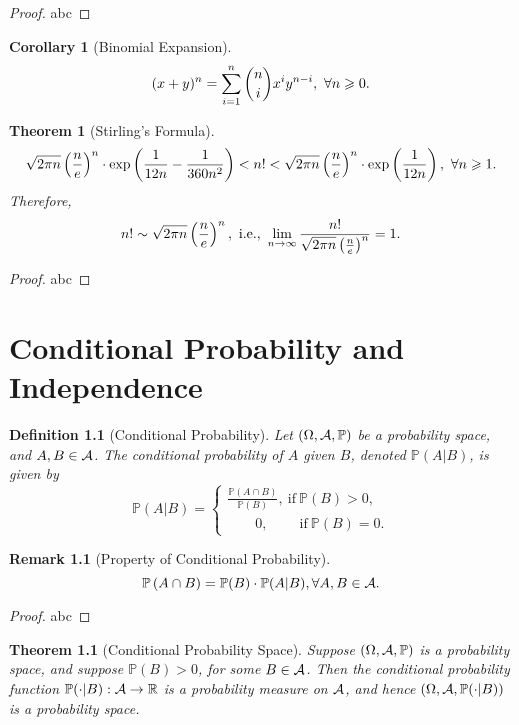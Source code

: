 \documentclass[openany,12pt]{book}
\newtheorem{theorem}{Theorem}[chapter]
\newtheorem{corollary}{Corollary}[chapter]
\newtheorem{remark}{Remark}[chapter]
\newtheorem{definition}{Definition}[chapter]
\begin{document}
\begin{proof}
  abc
\end{proof}

\begin{corollary}[Binomial Expansion]
$$(x+y)^n=\sum_{i=1}^{n}\binom n i  x^i y^{n-i},~\forall n\geqslant 0.$$
\end{corollary}

\begin{theorem}[Stirling's Formula]
$$\sqrt{2\pi n} 
\left(\frac{n}{e}\right)^n
\cdot
\exp\left(\frac{1}{12n}-\frac{1}{360 n^2 }\right) 
<n!
<\sqrt{2\pi n} 
\left(\frac{n}{e}\right)^n
\cdot\exp\left(\frac{1}{12n}\right),\ 
\forall n\gs1.$$
Therefore, 
$$n!\sim\sqrt{2\pi n} \left(\frac{n}{e}\right)^n,\ \text{i.e.},\ \limn \frac{n!}{\sqrt{2\pi n} \left(\frac{n}{e}\right)^n}=1.$$
\end{theorem}

\begin{proof}
  abc
\end{proof}

\chapter{Conditional Probability and Independence}

\begin{definition}[Conditional Probability]
Let $(\Omega,\mathcal{A},\mathbb{P})$ be a probability space, and $A,B\in\mathcal{A}$. The conditional probability of $A$ given $B$, denoted $\mathbb{P}(A|B)$, is given by
$$\mathbb{P}(A|B)=
\begin{cases}
\frac{\mathbb{P}(A\cap B)}{\mathbb{P}(B)},\ \text{if}\  \mathbb{P}(B)>0,  \\
     \qquad 0         ,\qquad\ \text{if}\  \mathbb{P}(B)=0.
\end{cases}
$$
\end{definition}

\begin{remark}[Property of Conditional Probability]
$$\mathbb{P}\left(A\cap B\right)=\mathbb{P}(B)\cdot \mathbb{P}(A|B),\forall A,B\in\mathcal{A}.$$ 
\end{remark}

\begin{proof}
  abc
\end{proof}

\begin{theorem}[Conditional Probability Space]
Suppose $(\Omega,\mathcal{A},\mathbb{P})$ is a probability space, and suppose $\mathbb{P}(B)>0$, for some $B\in\mathcal{A}$. 
Then the conditional probability function $\mathbb{P}(\cdot|B): \mathcal{A}\to\mathbb{R}$ is a probability measure on $\mathcal{A}$, and hence $(\Omega,\mathcal{A}, \mathbb{P}(\cdot|B))$ is a probability space.
\end{theorem}
\end{document}
